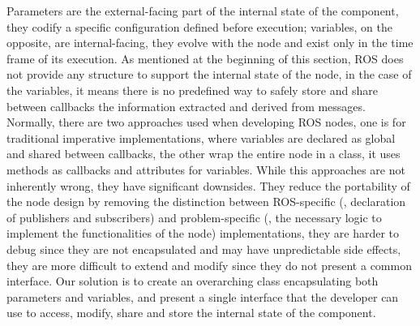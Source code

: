 Parameters are the external-facing part of the internal state of the component, they codify a specific configuration defined before execution; variables, on the opposite, are internal-facing, they evolve with the node and exist only in the time frame of its execution. As mentioned at the beginning of this section, ROS does not provide any structure to support the internal state of the node, in the case of the variables, it means there is no predefined way to safely store and share between callbacks the information extracted and derived from messages. Normally, there are two approaches used when developing ROS nodes, one is for traditional imperative implementations, where variables are declared as global and shared between callbacks, the other wrap the entire node in a class, it uses methods as callbacks and attributes for variables. While this approaches are not inherently wrong, they have significant downsides. They reduce the portability of the node design by removing the distinction between ROS-specific (\eg, declaration of publishers and subscribers) and problem-specific (\ie, the necessary logic to implement the functionalities of the node) implementations, they are harder to debug since they are not encapsulated and may have unpredictable side effects, they are more difficult to extend and modify since they do not present a common interface. Our solution is to create an overarching class encapsulating both parameters and variables, and present a single interface that the developer can use to access, modify, share and store the internal state of the component.

